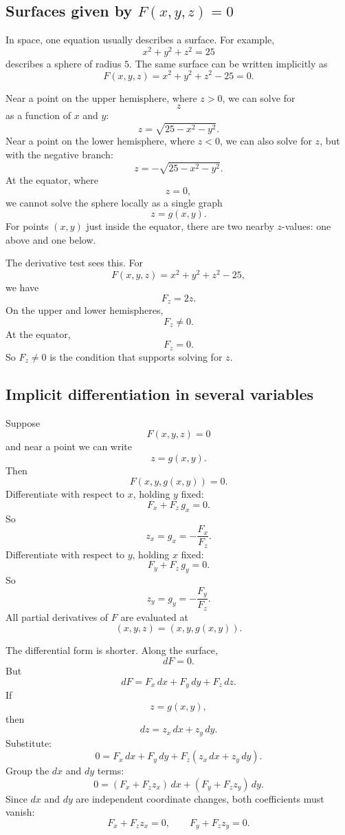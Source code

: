 \subsection{Surfaces given by \texorpdfstring{\(F(x,y,z)=0\)}{F(x,y,z)=0}}

In space, one equation usually describes a surface.  For example,
\[
    x^2+y^2+z^2=25
\]
describes a sphere of radius \(5\).  The same surface can be written implicitly as
\[
    F(x,y,z)=x^2+y^2+z^2-25=0.
\]

Near a point on the upper hemisphere, where \(z>0\), we can solve for
\[
    z
\]
as a function of \(x\) and \(y\):
\[
    z=\sqrt{25-x^2-y^2}.
\]
Near a point on the lower hemisphere, where \(z<0\), we can also solve for \(z\), but
with the negative branch:
\[
    z=-\sqrt{25-x^2-y^2}.
\]
At the equator, where
\[
    z=0,
\]
we cannot solve the sphere locally as a single graph
\[
    z=g(x,y).
\]
For points \((x,y)\) just inside the equator, there are two nearby \(z\)-values: one
above and one below.

The derivative test sees this.  For
\[
    F(x,y,z)=x^2+y^2+z^2-25,
\]
we have
\[
    F_z=2z.
\]
On the upper and lower hemispheres,
\[
    F_z\ne0.
\]
At the equator,
\[
    F_z=0.
\]
So \(F_z\ne0\) is the condition that supports solving for \(z\).

\subsection{Implicit differentiation in several variables}

Suppose
\[
    F(x,y,z)=0
\]
and near a point we can write
\[
    z=g(x,y).
\]
Then
\[
    F(x,y,g(x,y))=0.
\]
Differentiate with respect to \(x\), holding \(y\) fixed:
\[
    F_x+F_z\,g_x=0.
\]
So
\[
\boxed{
    z_x=g_x=-\frac{F_x}{F_z}.
}
\]
Differentiate with respect to \(y\), holding \(x\) fixed:
\[
    F_y+F_z\,g_y=0.
\]
So
\[
\boxed{
    z_y=g_y=-\frac{F_y}{F_z}.
}
\]
All partial derivatives of \(F\) are evaluated at
\[
    (x,y,z)=(x,y,g(x,y)).
\]

The differential form is shorter.  Along the surface,
\[
    dF=0.
\]
But
\[
    dF=F_x\,dx+F_y\,dy+F_z\,dz.
\]
If
\[
    z=g(x,y),
\]
then
\[
    dz=z_x\,dx+z_y\,dy.
\]
Substitute:
\[
    0=
    F_x\,dx+F_y\,dy+F_z(z_x\,dx+z_y\,dy).
\]
Group the \(dx\) and \(dy\) terms:
\[
    0=(F_x+F_z z_x)\,dx+(F_y+F_z z_y)\,dy.
\]
Since \(dx\) and \(dy\) are independent coordinate changes, both coefficients must
vanish:
\[
    F_x+F_z z_x=0,
    \qquad
    F_y+F_z z_y=0.
\]

